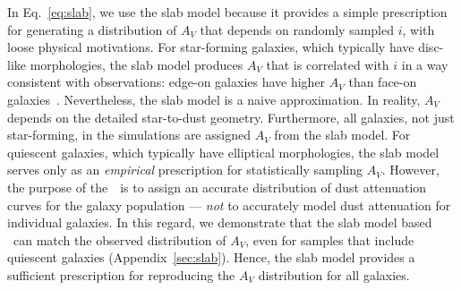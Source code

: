 In Eq.~\ref{eq:slab}, we use the slab model because it provides a simple
prescription for generating a distribution of $A_V$ that depends on
randomly sampled $i$, with loose physical motivations.
For star-forming galaxies, which typically have disc-like morphologies, the
slab model produces $A_V$ that is correlated with $i$ in a way consistent
with observations: edge-on galaxies have higher $A_V$ than face-on
galaxies~\citep[\eg][]{conroy2010, wild2011, battisti2017, salim2020}.
Nevertheless, the slab model is a naive approximation. 
In reality, $A_V$ depends on the detailed star-to-dust geometry.
Furthermore, all galaxies, not just star-forming, in the simulations are
assigned $A_V$ from the slab model.
For quiescent galaxies, which typically have elliptical morphologies, the
slab model serves only as an \emph{empirical} prescription for statistically 
sampling $A_V$. 
However, the purpose of the~\eda~is to assign an accurate distribution of dust
attenuation curves for the galaxy population --- \emph{not} to accurately
model dust attenuation for individual galaxies.
In this regard, we demonstrate that the slab model based \eda~can match the
observed distribution of $A_V$, even for samples that include quiescent
galaxies (Appendix~\ref{sec:slab}).
Hence, the slab model provides a sufficient prescription for reproducing
the $A_V$ distribution for all galaxies. 

